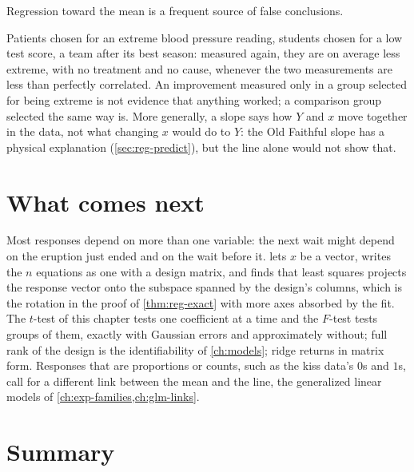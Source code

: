 Regression toward the mean is a frequent source of false conclusions.

\begin{pitfall}
Patients chosen for an extreme blood pressure reading, students chosen for a low test score, a team after its best season: measured again, they are on average less extreme, with no treatment and no cause, whenever the two measurements are less than perfectly correlated. An improvement measured only in a group selected for being extreme is not evidence that anything worked; a comparison group selected the same way is. More generally, a slope says how $Y$ and $x$ move together in the data, not what changing $x$ would do to $Y$: the Old Faithful slope has a physical explanation (\cref{sec:reg-predict}), but the line alone would not show that.
\end{pitfall}

\section{What comes next}
\label{sec:reg-next}

Most responses depend on more than one variable: the next wait might depend on the eruption just ended and on the wait before it.
 lets $x$ be a vector, writes the $n$ equations as one with a design matrix, and finds that least squares projects the response vector onto the subspace spanned by the design's columns, which is the rotation in the proof of \cref{thm:reg-exact} with more axes absorbed by the fit.
The $t$-test of this chapter tests one coefficient at a time and the $F$-test tests groups of them, exactly with Gaussian errors and approximately without; full rank of the design is the identifiability of \cref{ch:models}; ridge returns in matrix form.
Responses that are proportions or counts, such as the kiss data's $0$s and $1$s, call for a different link between the mean and the line, the generalized linear models of \cref{ch:exp-families,ch:glm-links}.

\section{Summary}
\label{sec:reg-summary}

